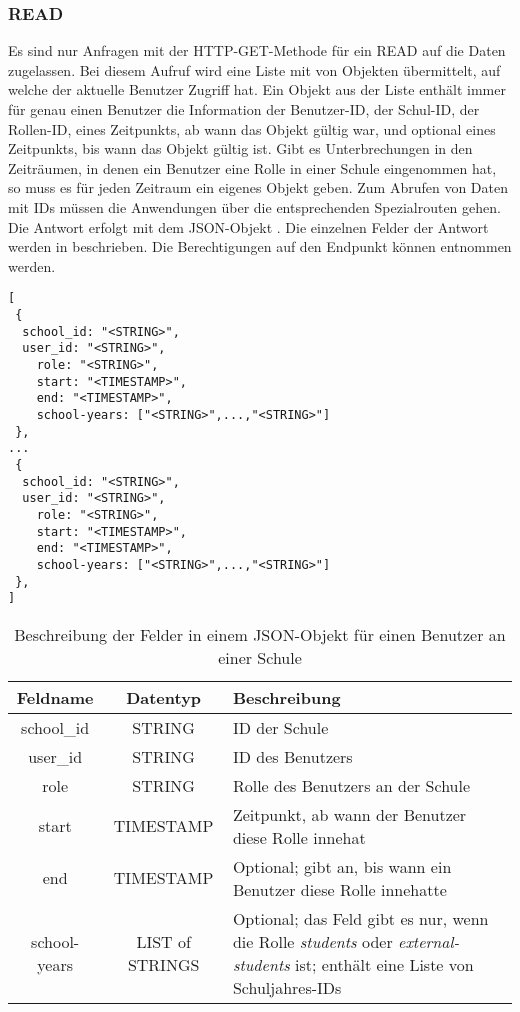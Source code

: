 
\subsubsection{READ}
\label{sec:rest:api:school:users:read}
Es sind nur Anfragen mit der HTTP-GET-Methode für ein READ auf die Daten zugelassen.
Bei diesem Aufruf wird eine Liste mit von Objekten übermittelt, auf welche der aktuelle Benutzer Zugriff hat.
Ein Objekt aus der Liste enthält immer für genau einen Benutzer die Information der Benutzer-ID, der Schul-ID, der Rollen-ID, eines Zeitpunkts, ab wann das Objekt gültig war, und optional eines Zeitpunkts, bis wann das Objekt gültig ist.
Gibt es Unterbrechungen in den Zeiträumen, in denen ein Benutzer eine Rolle in einer Schule eingenommen hat, so muss es für jeden Zeitraum ein eigenes Objekt geben.
Zum Abrufen von Daten mit IDs müssen die Anwendungen über die entsprechenden Spezialrouten gehen.
Die Antwort erfolgt mit dem JSON-Objekt . 
Die einzelnen Felder der Antwort werden in  beschrieben.
Die Berechtigungen auf den Endpunkt können  entnommen werden.


\begin{lstlisting}[caption={JSON-Antwort für einen GET-Aufruf der Route /api/school/users},label={lst:code:end:rest:api:school:users:read:ret},frame=tlrb]
[
 {
  school_id: "<STRING>",
  user_id: "<STRING>",
	role: "<STRING>",
	start: "<TIMESTAMP>",
	end: "<TIMESTAMP>",
	school-years: ["<STRING>",...,"<STRING>"]
 },
...
 {
  school_id: "<STRING>",
  user_id: "<STRING>",
	role: "<STRING>",
	start: "<TIMESTAMP>",
	end: "<TIMESTAMP>",
	school-years: ["<STRING>",...,"<STRING>"]
 },
]
\end{lstlisting}

\begin{table}[htb]
	\begin{tabularx}{\textwidth}{|c|c|X|}
		\hline
			\textbf{Feldname} & \textbf{Datentyp} & \textbf{Beschreibung} \\ \hline
			school\_id & STRING & ID der Schule \\ \hline
			user\_id & STRING & ID des Benutzers \\ \hline
			role & STRING & Rolle des Benutzers an der Schule \\ \hline
			start & TIMESTAMP & Zeitpunkt, ab wann der Benutzer diese Rolle innehat \\ \hline
			end & TIMESTAMP & Optional; gibt an, bis wann ein Benutzer diese Rolle innehatte \\ \hline
			school-years & LIST of STRINGS & Optional; das Feld gibt es nur, wenn die Rolle \textit{students} oder \textit{external-students} ist; enthält eine Liste von Schuljahres-IDs \\ \hline 
	\end{tabularx}

		\caption{Beschreibung der Felder in einem JSON-Objekt für einen Benutzer an einer Schule}
		\label{tab:end:rest:api:school:users:read:ret:json}
\end{table}

